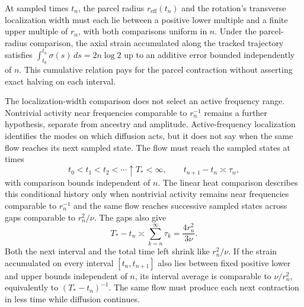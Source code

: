 At sampled times \(t_n\), the parcel radius \(r_{\mathrm{eff}}(t_n)\) and the rotation's transverse localization width must each lie between a positive lower multiple and a finite upper multiple of \(r_n\), with both comparisons uniform in \(n\). Under the parcel-radius comparison, the axial strain accumulated along the tracked trajectory satisfies \(\int_{t_0}^{t_n}\sigma(s)\,ds=2n\log 2\) up to an additive error bounded independently of \(n\). This cumulative relation pays for the parcel contraction without asserting exact halving on each interval.

The localization-width comparison does not select an active frequency range. Nontrivial activity near frequencies comparable to \(r_n^{-1}\) remains a further hypothesis, separate from ancestry and amplitude. Active-frequency localization identifies the modes on which diffusion acts, but it does not say when the same flow reaches its next sampled state. The flow must reach the sampled states at times
\[
  t_0<t_1<t_2<\cdots\uparrow T_*<\infty,
  \qquad
  t_{n+1}-t_n\asymp\tau_n,
\]
with comparison bounds independent of \(n\). The linear heat comparison describes this conditional history only when nontrivial activity remains near frequencies comparable to \(r_n^{-1}\) and the same flow reaches successive sampled states across gaps comparable to \(r_n^2/\nu\). The gaps also give
\[
  T_*-t_n
  \asymp
  \sum_{k=n}^{\infty}\tau_k
  =
  \frac{4r_n^2}{3\nu}.
\]
Both the next interval and the total time left shrink like \(r_n^2/\nu\). If the strain accumulated on every interval \([t_n,t_{n+1}]\) also lies between fixed positive lower and upper bounds independent of \(n\), its interval average is comparable to \(\nu/r_n^2\), equivalently to \((T_*-t_n)^{-1}\). The same flow must produce each next contraction in less time while diffusion continues.
